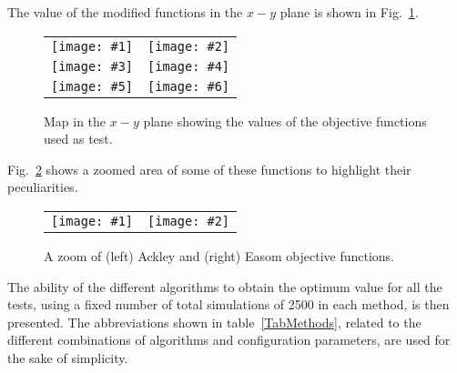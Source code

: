 \documentclass[review,authoryear]{elsarticle}
\newcommand{\TABLE}[5]
{
	\begin{table}[ht!]
		\centering
		\caption{#4.\label{#5}}
		#1
		\tabulinesep=0.9mm
		\begin{tabu}{#2}
			#3
		\end{tabu}
	\end{table}
}
\newcommand{\PLOTII}[4]
{
	\begin{figure}[ht!]
		\centering
		\begin{tabular}{cc}
			\texttt{[image: \#1]} & \texttt{[image: \#2]}
		\end{tabular}
		\caption{#3.\label{#4}}
	\end{figure}
}
\newcommand{\FIGVI}[8]
{
	\begin{figure}[ht!]
		\centering
		\begin{tabular}{cc}
			\texttt{[image: \#1]} & \texttt{[image: \#2]} \\
			\texttt{[image: \#3]} & \texttt{[image: \#4]} \\
			\texttt{[image: \#5]} & \texttt{[image: \#6]}
		\end{tabular}
		\caption{#7.\label{#8}}
	\end{figure}
}
\begin{document}
The value of the modified functions in the $x-y$ plane is shown in
Fig.~\ref{FigTests}.
\FIGVI{Sphere.eps}{Ackley.eps}{Booth.eps}{Rosenbrock.eps}{Easom.eps}{Beale.eps}
{Map in the $x-y$ plane showing the values of the objective functions used as 
test}{FigTests}
Fig.~\ref{FigTestsZoom} shows a zoomed area of some of these functions to 
highlight their peculiarities.
\PLOTII{Ackley2.eps}{Easom2.eps}{A zoom of (left) Ackley and (right) Easom
objective functions}{FigTestsZoom}

The ability of the different algorithms to obtain the optimum
value for all the tests, using a fixed number of total simulations of 2500 in each method,
is then presented. The abbreviations shown in table~\ref{TabMethods}, related 
to the different combinations of algorithms and configuration parameters, are used
for the sake of simplicity.
\end{document}
